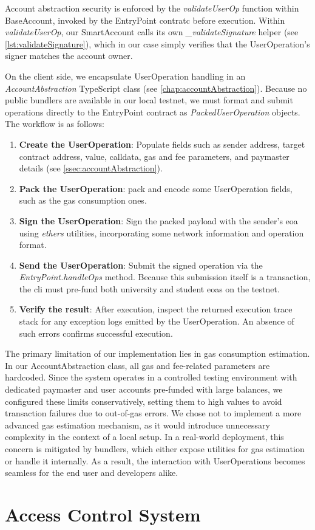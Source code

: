Account abstraction security is enforced by the \textit{validateUserOp} function within BaseAccount, invoked by the EntryPoint contratc before execution. Within \textit{validateUserOp}, our SmartAccount calls its own \textit{\_validateSignature} helper (see \cref{lst:validateSignature}),  which in our case simply verifies that the UserOperation’s signer matches the account owner.


On the client side, we encapsulate UserOperation handling in an \textit{AccountAbstraction} TypeScript class (see \cref{chap:accountAbstraction}). Because no public bundlers are available in our local testnet, we must format and submit operations directly to the EntryPoint contract as \textit{PackedUserOperation} objects. The workflow is as follows:
\begin{enumerate}
    \item \textbf{Create the UserOperation}: Populate fields such as sender address, target contract address, value, calldata, gas and fee parameters, and paymaster details (see \cref{ssec:accountAbstraction}).
    \item \textbf{Pack the UserOperation}: pack and encode some UserOperation fields, such as the gas consumption ones.
    \item \textbf{Sign the UserOperation}: Sign the packed payload with the sender's \acrshort{eoa} using \textit{ethers} utilities, incorporating some network information and operation format.
    \item \textbf{Send the UserOperation}: Submit the signed operation via the \textit{EntryPoint.handleOps} method. Because this submission itself is a transaction, the \acrshort{cli} must pre-fund both university and student \acrlong{eoa}s on the testnet. 
    \item \textbf{Verify the result}: After execution, inspect the returned execution trace stack for any exception logs emitted by the UserOperation. An absence of such errors confirms successful execution.
\end{enumerate}

The primary limitation of our implementation lies in gas consumption estimation. In our AccountAbstraction class, all gas and fee-related parameters are hardcoded. Since the system operates in a controlled testing environment with dedicated paymaster and user accounts pre-funded with large balances, we configured these limits conservatively, setting them to high values to avoid transaction failures due to out-of-gas errors.
We chose not to implement a more advanced gas estimation mechanism, as it would introduce unnecessary complexity in the context of a local setup. In a real-world deployment, this concern is mitigated by bundlers, which either expose utilities for gas estimation or handle it internally. As a result, the interaction with UserOperations becomes seamless for the end user and developers alike.

\section{Access Control System}